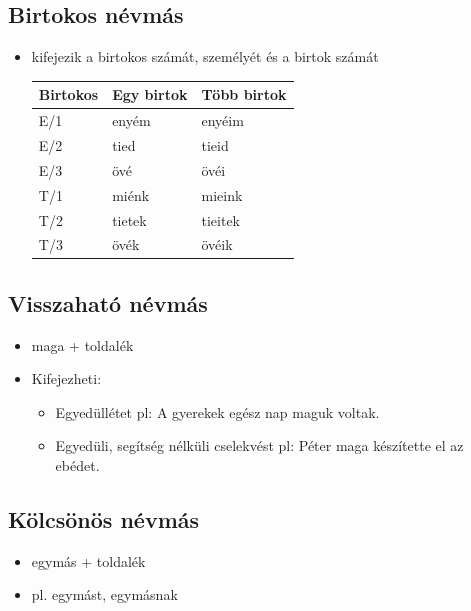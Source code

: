 \documentclass{article}
\begin{document}
\subsection{Birtokos névmás}
\begin{itemize}
    \item kifejezik a birtokos számát, személyét és a birtok számát
    \\ \begin{tabular}{|l|l|l|}
\hline
Birtokos & Egy birtok & Több birtok \\ \hline
E/1 & enyém & enyéim \\ \hline
E/2 & tied & tieid  \\ \hline
E/3 & övé & övéi \\ \hline
T/1 & miénk  & mieink \\ \hline
T/2 & tietek & tieitek \\ \hline
T/3 & övék & övéik \\ \hline
\end{tabular}
\end{itemize}

\subsection{Visszaható névmás}
\begin{itemize}
    \item maga + toldalék
    \item Kifejezheti: \begin{itemize}
        \item Egyedüllétet pl: A gyerekek egész nap maguk voltak.
        \item Egyedüli, segítség nélküli cselekvést pl: Péter maga készítette el az ebédet. 
    \end{itemize}
\end{itemize}

\subsection{Kölcsönös névmás}
\begin{itemize}
    \item egymás + toldalék
    \item pl. egymást, egymásnak
\end{itemize}

\newpage
\end{document}
